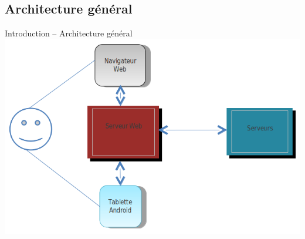 \documentclass{beamer}
\begin{document}
\subsection{Architecture général}
\begin{frame}{Introduction -- Architecture général}
	\includegraphics[width=\textwidth]{./images/diaBiha.png}
\end{frame}
\end{document}

